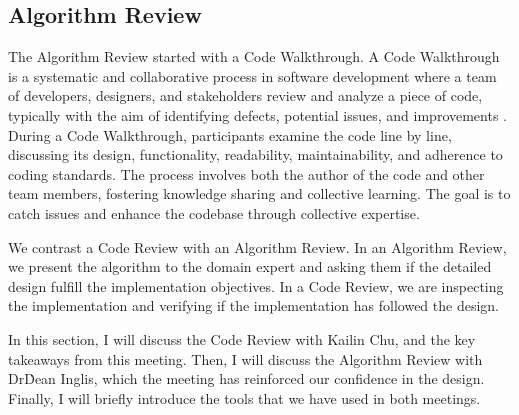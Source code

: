 \subsection{Algorithm Review}

The Algorithm Review started with a Code Walkthrough. A Code Walkthrough is a systematic and collaborative process in software development where a team of developers, designers, and stakeholders review and analyze a piece of code, typically with the aim of identifying defects, potential issues, and improvements \cite{Corporate_2023}. During a Code Walkthrough, participants examine the code line by line, discussing its design, functionality, readability, maintainability, and adherence to coding standards. The process involves both the author of the code and other team members, fostering knowledge sharing and collective learning. The goal is to catch issues and enhance the codebase through collective expertise.

We contrast a Code Review with an Algorithm Review. In an Algorithm Review, we present the algorithm to the domain expert and asking them if the detailed design fulfill the implementation objectives. In a Code Review, we are inspecting the implementation and verifying if the implementation has followed the design. 

In this section, I will discuss the Code Review with Kailin Chu, and the key takeaways from this meeting. Then, I will discuss the Algorithm Review with Dr\. Dean Inglis, which the meeting has reinforced our confidence in the design. Finally, I will briefly introduce the tools that we have used in both meetings.

